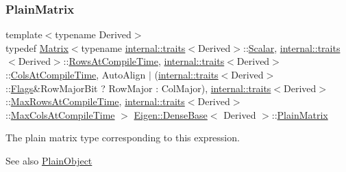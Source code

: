 \subsubsection{\texorpdfstring{PlainMatrix}{PlainMatrix}}
{\footnotesize\ttfamily template$<$typename Derived$>$ \\
typedef \mbox{\hyperlink{class_eigen_1_1_matrix}{Matrix}}$<$typename \mbox{\hyperlink{struct_eigen_1_1internal_1_1traits}{internal\+::traits}}$<$Derived$>$\+::\mbox{\hyperlink{class_eigen_1_1_dense_base_a5feed465b3a8e60c47e73ecce83e39a2}{Scalar}}, \mbox{\hyperlink{struct_eigen_1_1internal_1_1traits}{internal\+::traits}}$<$Derived$>$\+::\mbox{\hyperlink{class_eigen_1_1_dense_base_a86241c772c74c04eeeb0480b99c5ab77adb37c78ebbf15aa20b65c3b70415a1ab}{Rows\+At\+Compile\+Time}}, \mbox{\hyperlink{struct_eigen_1_1internal_1_1traits}{internal\+::traits}}$<$Derived$>$\+::\mbox{\hyperlink{class_eigen_1_1_dense_base_a86241c772c74c04eeeb0480b99c5ab77a787f85fd67ee5985917eb2cef6e70441}{Cols\+At\+Compile\+Time}}, Auto\+Align $\vert$ (\mbox{\hyperlink{struct_eigen_1_1internal_1_1traits}{internal\+::traits}}$<$Derived$>$\+::\mbox{\hyperlink{class_eigen_1_1_dense_base_a86241c772c74c04eeeb0480b99c5ab77a7392c9b2ad41ba3c16fdc5306c04d581}{Flags}}\&Row\+Major\+Bit ? Row\+Major \+: Col\+Major), \mbox{\hyperlink{struct_eigen_1_1internal_1_1traits}{internal\+::traits}}$<$Derived$>$\+::\mbox{\hyperlink{class_eigen_1_1_dense_base_a86241c772c74c04eeeb0480b99c5ab77ad2baadea085372837b0e80dc93be1306}{Max\+Rows\+At\+Compile\+Time}}, \mbox{\hyperlink{struct_eigen_1_1internal_1_1traits}{internal\+::traits}}$<$Derived$>$\+::\mbox{\hyperlink{class_eigen_1_1_dense_base_a86241c772c74c04eeeb0480b99c5ab77acc3a41000cf1d29dd1a320b2a09d2a65}{Max\+Cols\+At\+Compile\+Time}} $>$ \mbox{\hyperlink{class_eigen_1_1_dense_base}{Eigen\+::\+Dense\+Base}}$<$ Derived $>$\+::\mbox{\hyperlink{class_eigen_1_1_dense_base_aa301ef39d63443e9ef0b84f47350116e}{Plain\+Matrix}}}

The plain matrix type corresponding to this expression. \begin{DoxySeeAlso}{See also}
\mbox{\hyperlink{class_eigen_1_1_dense_base_aae45af9b5aca5a9caae98fd201f47cc4}{Plain\+Object}} 
\end{DoxySeeAlso}
\mbox{\label{class_eigen_1_1_dense_base_aae45af9b5aca5a9caae98fd201f47cc4}} 
